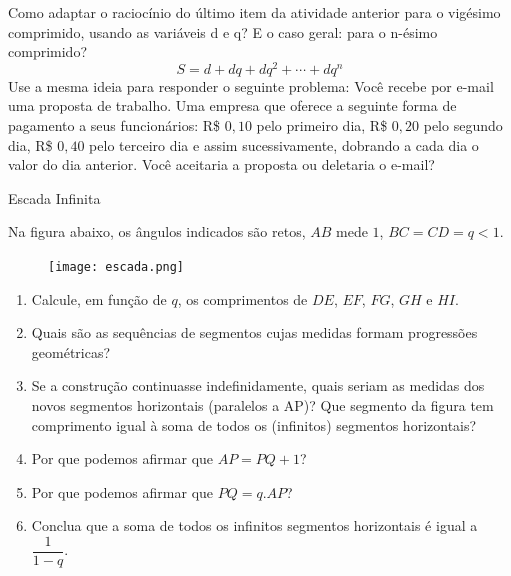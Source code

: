 \begin{reflection} 

Como adaptar o raciocínio do último item da atividade anterior para o vigésimo comprimido, usando as variáveis d e q? E o caso geral: para o n-ésimo comprimido?
\[
S=d+dq+dq^2+\cdots +dq^n
\]
Use a mesma ideia para responder o seguinte problema: Você recebe por e-mail uma proposta de trabalho. Uma empresa que oferece a seguinte forma de pagamento a seus funcionários: R\$ $0{,}10$ pelo primeiro dia, R\$ $0{,}20$ pelo segundo dia, R\$ $0{,}40$ pelo terceiro dia e assim sucessivamente, dobrando a cada dia o valor do dia anterior. Você aceitaria a proposta ou deletaria o e-mail?

\end{reflection}

\begin{task}{Escada Infinita}

Na figura abaixo, os ângulos indicados são retos, $AB$ mede $1$, $BC=CD=q<1$. 

\begin{figure}[H]
\centering
\texttt{[image: escada.png]}
\end{figure}

\begin{enumerate}

\item{}
Calcule, em função de $q$, os comprimentos de $DE$, $EF$, $FG$, $GH$ e $HI$.

\item{}
Quais são as sequências de segmentos cujas medidas formam progressões geométricas?

\item{}
Se a construção continuasse indefinidamente, quais seriam as medidas dos novos segmentos horizontais (paralelos a AP)? Que segmento da figura tem comprimento igual à soma de todos os (infinitos) segmentos horizontais? 

\item{}
Por que podemos afirmar que $AP= PQ +1$?

\item{}
Por que podemos afirmar que $PQ=q . AP$?

\item{}
Conclua que a soma de todos os infinitos segmentos horizontais é igual a  $\dfrac{1}{1-q}$.

\end{enumerate}

\end{task}



